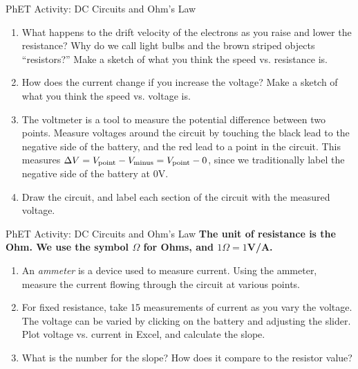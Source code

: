 \documentclass{beamer}
\begin{document}
\begin{frame}{PhET Activity: DC Circuits and Ohm's Law}
\small
\begin{enumerate}
\item What happens to the drift velocity of the electrons as you raise and lower the resistance?  Why do we call light bulbs and the brown striped objects ``resistors?''  Make a sketch of what you think the speed vs. resistance is.
\item How does the current change if you increase the voltage? Make a sketch of what you think the speed vs. voltage is.
\item The voltmeter is a tool to measure the potential difference between two points.  Measure voltages around the circuit by touching the black lead to the negative side of the battery, and the red lead to a point in the circuit.  This measures $\Delta V = V_{\rm point} - V_{\rm minus} = V_{\rm point} - 0$, since we traditionally label the negative side of the battery at 0V.
\item Draw the circuit, and label each section of the circuit with the measured voltage.
\end{enumerate}
\end{frame}

\begin{frame}{PhET Activity: DC Circuits and Ohm's Law}
\textbf{The unit of resistance is the Ohm.  We use the symbol $\Omega$ for Ohms, and $1\Omega = 1$V/A.}
\begin{enumerate}
\item An \textit{ammeter} is a device used to measure current.  Using the ammeter, measure the current flowing through the circuit at various points.
\item For fixed resistance, take 15 measurements of current as you vary the voltage.  The voltage can be varied by clicking on the battery and adjusting the slider.  Plot voltage vs. current in Excel, and calculate the slope.
\item What is the number for the slope?  How does it compare to the resistor value?
\end{enumerate}
\end{frame}
\end{document}
